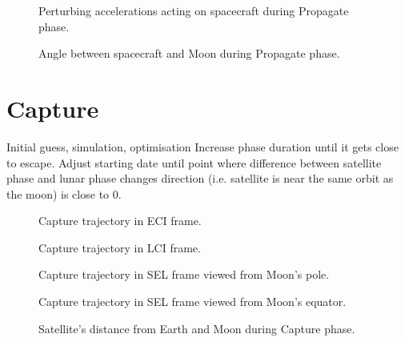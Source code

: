 \begin{figure}
\centering
%
\caption{Perturbing accelerations acting on spacecraft during Propagate phase.}
\label{fig:Propagate-pert2}
\end{figure}

\begin{figure}
\centering
%
\caption{Angle between spacecraft and Moon during Propagate phase.}
\label{fig:Propagate-phase}
\end{figure}


\clearpage

\section{Capture}
Initial guess, simulation, optimisation
Increase phase duration until it gets close to escape.
Adjust starting date until point where difference between satellite phase and lunar phase changes direction (i.e. satellite is near the same orbit as the moon) is close to 0\degrees.

\begin{figure}
\centering
%
\caption{Capture trajectory in ECI frame.}
\label{fig:Capture-3D}
\end{figure}

\begin{figure}
\centering
%
\caption{Capture trajectory in LCI frame.}
\label{fig:Capture-3D-eci}
\end{figure}

\begin{figure}
\centering
%
\caption{Capture trajectory in SEL frame viewed from Moon's pole.}
\label{fig:Capture-3D-sel-above}
\end{figure}

\begin{figure}
\centering
%
\caption{Capture trajectory in SEL frame viewed from Moon's equator.}
\label{fig:Capture-3D-sel-side}
\end{figure}

\begin{figure}
\centering
%
\caption{Satellite's distance from Earth and Moon during Capture phase.}
\label{fig:Capture-dist}
\end{figure}

